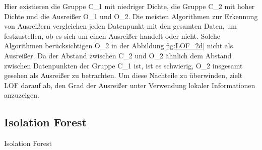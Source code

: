                 Hier existieren die Gruppe C_1 mit niedriger Dichte, die Gruppe C_2 mit hoher Dichte und die Ausreißer O_1 und O_2. Die meisten Algorithmen zur Erkennung von Ausreißern vergleichen jeden Datenpunkt mit den gesamten Daten, um festzustellen, ob es sich um einen Ausreißer handelt oder nicht. Solche Algorithmen berücksichtigen O_2 in der Abbildung\ref{fig:LOF_2d} nicht als Ausreißer. Da der Abstand zwischen C_2 und O_2 ähnlich dem Abstand zwischen Datenpunkten der Gruppe C_1 ist, ist es schwierig, O_2 insgesamt gesehen als Ausreißer zu betrachten. Um diese Nachteile zu überwinden, zielt LOF darauf ab, den Grad der Ausreißer unter Verwendung lokaler Informationen anzuzeigen.

            \subsection{Isolation Forest}
                Isolation Forest
                
            